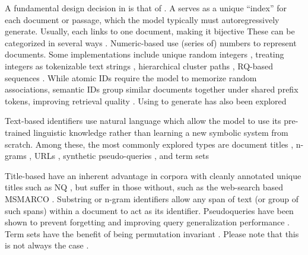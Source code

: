 A fundamental design decision in  is that of . A  serves as a unique ``index'' for each document or passage, which the model typically must autoregressively generate. Usually, each  links to one document, making it bijective \cite{xiaoxi-li-from-matching} %
These can be categorized in several ways \cite{xiaoxi-li-from-matching}. Numeric-based  use (series of) numbers to represent documents. Some implementations include unique random integers \cite{yi-tay-transformer-memory}, treating integers as tokenizable text strings \cite{yi-tay-transformer-memory}, hierarchical cluster paths \cite{weiwei-sun-learning-to}, RQ\cite{chen-approximate-nearest}-based  sequences \cite{hansi-zeng-scalable-and}. While atomic IDs require the model to memorize random associations, semantic IDs group similar documents together under shared prefix tokens, improving retrieval quality \cite{ronak-pradeep-how-does}. Using  to generate  has also been explored \cite{weiwei-sun-learning-to,hansi-zeng-scalable-and}

Text-based identifiers use natural language  which allow the model to use its pre-trained linguistic knowledge rather than learning a new symbolic system from scratch. Among these, the most commonly explored types are document titles \cite{nicola-de-cao-autoregressive-entity,chen-corpusbrain-pretrain,chen-gere-generative,yujia-zhou-ultron-an}, n-grams \cite{michele-bevilacqua-autoregressive-search,yongqi-li-multiview-identifiers,yongqi-li-learning-to,li-distillation-enhanced}, URLs \cite{ziems-large-language,yujia-zhou-ultron-an}, synthetic pseudo-queries \cite{yongqi-li-multiview-identifiers,yongqi-li-learning-to,li-distillation-enhanced,yujing-wang-a-neural,shengyao-zhuang-bridging-the}, and term sets \cite{peitian-zhang-generative-retrieval,hansi-zeng-planning-ahead}

Title-based  have an inherent advantage in corpora with cleanly annotated unique titles such as NQ \cite{kwiatkowski-natural-questions}, but suffer in those without, such as the web-search based MSMARCO \cite{payal-bajaj-ms-marco}. Substring or n-gram identifiers allow any span of text (or group of such spans) within a document to act as its identifier. Pseudoqueries have been shown to prevent forgetting \cite{chen-continual-learning} and improving query generalization performance \cite{ronak-pradeep-how-does}.
Term sets have the benefit of being  permutation invariant \cite{peitian-zhang-generative-retrieval}. Please note that this is not always the case \cite{hansi-zeng-planning-ahead}.

